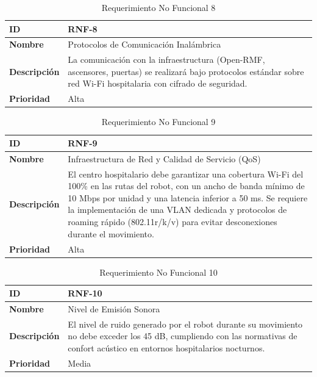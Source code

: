 \begin{table}[H]
\centering
\begin{tabular}{|l|p{10cm}|}
\hline
\textbf{ID} & RNF-8 \\ \hline
\textbf{Nombre} & Protocolos de Comunicación Inalámbrica \\ \hline
\textbf{Descripción} & La comunicación con la infraestructura (Open-RMF, ascensores, puertas) se realizará bajo protocolos estándar sobre red Wi-Fi hospitalaria con cifrado de seguridad. \\ \hline
\textbf{Prioridad} & Alta \\ \hline
\end{tabular}
\caption{Requerimiento No Funcional 8}
\end{table}

\begin{table}[H]
\centering
\begin{tabular}{|l|p{10cm}|}
\hline
\textbf{ID} & RNF-9 \\ \hline
\textbf{Nombre} & Infraestructura de Red y Calidad de Servicio (QoS) \\ \hline
\textbf{Descripción} & El centro hospitalario debe garantizar una cobertura Wi-Fi del 100\% en las rutas del robot, con un ancho de banda mínimo de 10 Mbps por unidad y una latencia inferior a 50 ms. Se requiere la implementación de una VLAN dedicada y protocolos de roaming rápido (802.11r/k/v) para evitar desconexiones durante el movimiento. \\ \hline
\textbf{Prioridad} & Alta \\ \hline
\end{tabular}
\caption{Requerimiento No Funcional 9}
\end{table}

\begin{table}[H]
\centering
\begin{tabular}{|l|p{10cm}|}
\hline
\textbf{ID} & RNF-10 \\ \hline
\textbf{Nombre} & Nivel de Emisión Sonora \\ \hline
\textbf{Descripción} & El nivel de ruido generado por el robot durante su movimiento no debe exceder los 45 dB, cumpliendo con las normativas de confort acústico en entornos hospitalarios nocturnos. \\ \hline
\textbf{Prioridad} & Media \\ \hline
\end{tabular}
\caption{Requerimiento No Funcional 10}
\end{table}

